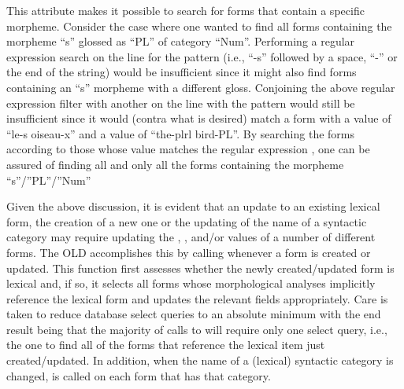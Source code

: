 \documentclass[letterpaper,10pt,english]{sphinxmanual}
\begin{document}
This attribute makes it possible to search for forms that contain a specific
morpheme.  Consider the case where one wanted to find all forms containing the
morpheme ``s'' glossed as ``PL'' of category ``Num''.  Performing a regular expression
search on the  line for the pattern  (i.e., ``-s''
followed by a space, ``-'' or the end of the string) would be insufficient since
it might also find forms containing an ``s'' morpheme with a different gloss.
Conjoining the above regular expression filter with another on the
 line with the pattern  would still be
insufficient since it would (contra what is desired) match a form with a
 value of ``le-s oiseau-x'' and a  value of
``the-plrl bird-PL''.  By searching the forms according to those whose
 value matches the regular expression
, one can be assured of finding all and only all the forms
containing the morpheme ``s''/''PL''/''Num''

Given the above discussion, it is evident that an update to an existing
lexical form, the creation of a new one or the updating of the name of a
syntactic category may require updating the ,
,  and/or 
values of a number of different forms.  The OLD accomplishes this by calling
 whenever a form is created or
updated.  This function first assesses whether the newly created/updated form is
lexical and, if so, it selects all forms whose morphological analyses implicitly
reference the lexical form and updates the relevant fields appropriately.  Care
is taken to reduce database select queries to an absolute minimum with the end
result being that the majority of calls to
 will require only one select query,
i.e., the one to find all of the forms that reference the lexical item just
created/updated.  In addition, when the name of a (lexical) syntactic category
is changed,  is called on each form
that has that category.
\end{document}

